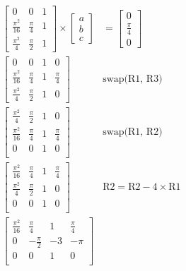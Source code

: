 \documentclass[12pt,twoside]{amsart}
\begin{document}
\begin{enumerate}
    \begin{align*}
    \left[\begin{array}{ccc}
        0 & 0 & 1 \\ 
        \frac{\pi^2}{16} & \frac{\pi}{4} & 1 \\ 
        \frac{\pi^2}{4} & \frac{\pi}{2} & 1
    \end{array}\right] \times \left[\begin{array}{c}
        a \\
        b \\
        c
    \end{array}\right] & = \left[\begin{array}{c}
        0 \\
        \frac{\pi}{4} \\
        0
    \end{array}\right] \\
    \left[\begin{array}{ccc|c}
        0 & 0 & 1 & 0 \\
        \frac{\pi^2}{16} & \frac{\pi}{4} & 1 & \frac{\pi}{4} \\
        \frac{\pi^2}{4} & \frac{\pi}{2} & 1 & 0
    \end{array}\right] & \text{swap(R1, R3)} \\
    \left[\begin{array}{ccc|c}
        \frac{\pi^2}{4} & \frac{\pi}{2} & 1 & 0 \\
        \frac{\pi^2}{16} & \frac{\pi}{4} & 1 & \frac{\pi}{4} \\
        0 & 0 & 1 & 0 \\
    \end{array}\right] & \text{swap(R1, R2)} \\
    \left[\begin{array}{ccc|c}
        \frac{\pi^2}{16} & \frac{\pi}{4} & 1 & \frac{\pi}{4} \\
        \frac{\pi^2}{4} & \frac{\pi}{2} & 1 & 0 \\
        0 & 0 & 1 & 0 \\
    \end{array}\right] & \text{R2} = \text{R2} - 4 \times \text{R1} \\
    \left[\begin{array}{ccc|c}
        \frac{\pi^2}{16} & \frac{\pi}{4} & 1 & \frac{\pi}{4} \\
        0 & -\frac{\pi}{2} & -3 & -\pi \\
        0 & 0 & 1 & 0 \\
    \end{array}\right]
    \end{align*}


\end{enumerate}
\end{document}
